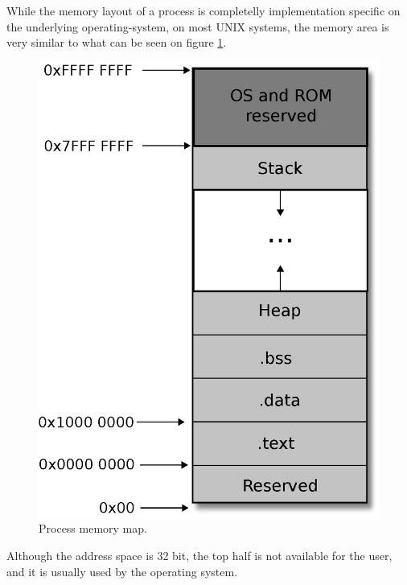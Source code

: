 While the memory layout of a process is completelly implementation specific on
the underlying operating-system, on most UNIX systems, the memory area is very
similar to what can be seen on figure \ref{fig:memory_layout}.
\begin{figure}[H]
	\centering
	\includegraphics[scale=0.40]{cpu_architecture/memory_layout.eps}
	\caption{Process memory map.}
	\label{fig:memory_layout}
\end{figure}

Although the address space is 32 bit, the top half is not available for the user,
and it is usually used by the operating system\cite{memory_layout}.

